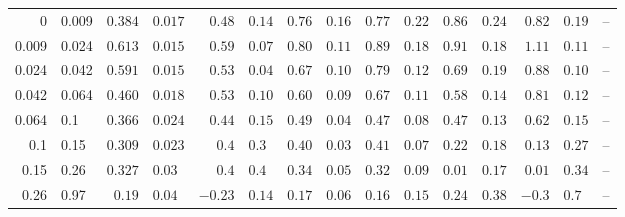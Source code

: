 \documentclass{aa}
\begin{document}
\begin{table}
\begin{centering}
{\begin{tabular}{r@{ -- }l r@{$\pm$}l r@{$\pm$}l r@{$\pm$}l r@{$\pm$}l r@{$\pm$}l r@{$\pm$}l r@{$\pm$}l}
0 & 0.009         & $0.384$ & $0.017$ & $0.48$ & $0.14$ & $0.76$ & $0.16$ & $0.77$ & $0.22$ & $0.86$ & $0.24$ & $0.82$ & $0.19$ & \multicolumn{2}{c}{--} \\
0.009 & 0.024 & $0.613$ & $0.015$ & $0.59$ & $0.07$ & $0.80$ & $0.11$ & $0.89$ & $0.18$ & $0.91$ & $0.18$ & $1.11$ & $0.11$ & \multicolumn{2}{c}{--} \\
0.024 & 0.042 & $0.591$ & $0.015$ & $0.53$ & $0.04$ & $0.67$ & $0.10$ & $0.79$ & $0.12$ & $0.69$ & $0.19$ & $0.88$ & $0.10$ & \multicolumn{2}{c}{--} \\
0.042 & 0.064 & $0.460$ & $0.018$ & $0.53$ & $0.10$ & $0.60$ & $0.09$ & $0.67$ & $0.11$ & $0.58$ & $0.14$ & $0.81$ & $0.12$ & \multicolumn{2}{c}{--} \\
0.064 & 0.1     & $0.366$ & $0.024$ & $0.44$ & $0.15$ & $0.49$ & $0.04$ & $0.47$ & $0.08$ & $0.47$ & $0.13$ & $0.62$ & $0.15$ & \multicolumn{2}{c}{--} \\
0.1 & 0.15       & $0.309$ & $0.023$ & $0.4$ & $0.3$ & $0.40$ & $0.03$ & $0.41$ & $0.07$ & $0.22$ & $0.18$ & $0.13$ & $0.27$ & \multicolumn{2}{c}{--} \\
0.15 & 0.26     & $0.327$ & $0.03$ & $0.4$ & $0.4$ & $0.34$ & $0.05$ & $0.32$ & $0.09$ & $0.01$ & $0.17$ & $0.01$ & $0.34$ & \multicolumn{2}{c}{--} \\
0.26 & 0.97      & $0.19$ & $0.04$ & $-0.23$ & $0.14$ & $0.17$ & $0.06$ & $0.16$ & $0.15$ & $0.24$ & $0.38$ & $-0.3$ & $0.7$ & \multicolumn{2}{c}{--} \\


\hline                                   %
\end{tabular}}
\par\end{centering}
\end{table}



























\end{document}
